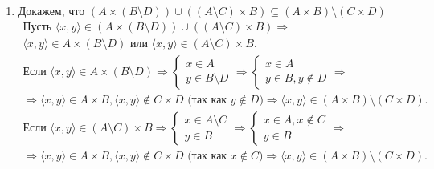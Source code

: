 \documentclass{article}
\begin{document}
\begin{enumerate}
\begin{gather*}
    \end{gather*}
    \item Докажем, что $(A \times (B \setminus D)) \cup ((A \setminus C) \times B) \subseteq (A \times B) \setminus (C \times D)$ \\
    \begin{gather*}
        \text{Пусть } \langle x, y \rangle \in (A \times (B \setminus D)) \cup ((A \setminus C) \times B) \Rightarrow \\ \langle x, y \rangle \in A \times (B \setminus D) \text{ или } \langle x, y \rangle \in (A \setminus C) \times B. \\
        \text{Если } \langle x, y \rangle \in A \times (B \setminus D) \Rightarrow
        \begin{cases}
            x \in A \\
            y \in B \setminus D
        \end{cases}
        \Rightarrow \begin{cases}
            x \in A \\
            y \in B, y \notin D
        \end{cases} \Rightarrow \\
        \Rightarrow \langle x, y \rangle \in A \times B, \langle x, y \rangle \notin C \times D \text { (так как } y \notin D) \Rightarrow \langle x, y \rangle \in (A \times B) \setminus (C \times D). \\
        \text{Если } \langle x, y \rangle \in (A \setminus C) \times B \Rightarrow
        \begin{cases}
            x \in A \setminus C \\
            y \in B
        \end{cases}
        \Rightarrow \begin{cases}
            x \in A, x \notin C \\
            y \in B
        \end{cases} \Rightarrow \\
        \Rightarrow \langle x, y \rangle \in A \times B, \langle x, y \rangle \notin C \times D \text{ (так как } x \notin C) \Rightarrow \langle x, y \rangle \in (A \times B) \setminus (C \times D).
    \end{gather*}
\end{enumerate}
\end{document}

